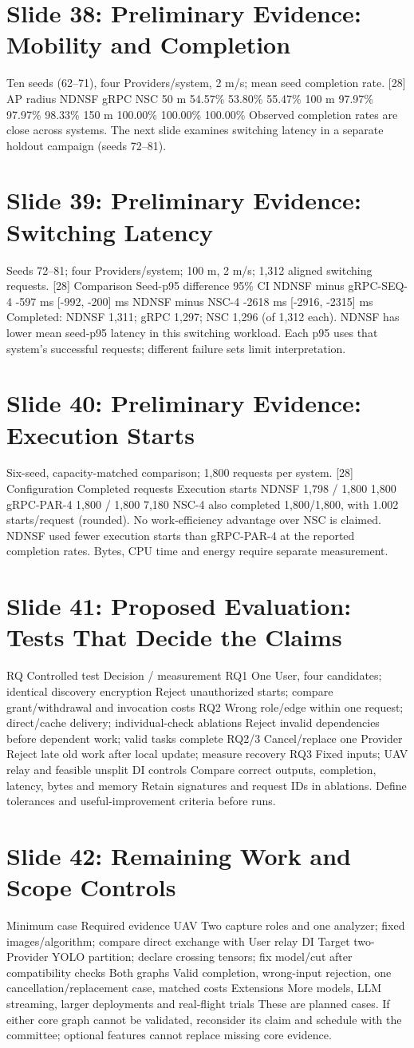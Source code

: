 \documentclass[11pt]{article}
\newcommand{\slideentry}[3]{\section*{Slide #1: #2}#3\par}
\begin{document}
\slideentry{38}{Preliminary Evidence: Mobility and Completion}{
Ten seeds (62--71), four Providers/system, 2 m/s; mean seed completion rate. [28] AP radius NDNSF gRPC NSC 50 m 54.57\% 53.80\% 55.47\% 100 m 97.97\% 97.97\% 98.33\% 150 m 100.00\% 100.00\% 100.00\% Observed completion rates are close across systems. The next slide examines switching latency in a separate holdout campaign (seeds 72--81).
}
\slideentry{39}{Preliminary Evidence: Switching Latency}{
Seeds 72--81; four Providers/system; 100 m, 2 m/s; 1,312 aligned switching requests. [28] Comparison Seed-p95 difference 95\% CI NDNSF minus gRPC-SEQ-4 -597 ms [-992, -200] ms NDNSF minus NSC-4 -2618 ms [-2916, -2315] ms Completed: NDNSF 1,311; gRPC 1,297; NSC 1,296 (of 1,312 each). NDNSF has lower mean seed-p95 latency in this switching workload. Each p95 uses that system’s successful requests; different failure sets limit interpretation.
}
\slideentry{40}{Preliminary Evidence: Execution Starts}{
Six-seed, capacity-matched comparison; 1,800 requests per system. [28] Configuration Completed requests Execution starts NDNSF 1,798 / 1,800 1,800 gRPC-PAR-4 1,800 / 1,800 7,180 NSC-4 also completed 1,800/1,800, with 1.002 starts/request (rounded). No work-efficiency advantage over NSC is claimed. NDNSF used fewer execution starts than gRPC-PAR-4 at the reported completion rates. Bytes, CPU time and energy require separate measurement.
}
\slideentry{41}{Proposed Evaluation: Tests That Decide the Claims}{
RQ Controlled test Decision / measurement RQ1 One User, four candidates; identical discovery encryption Reject unauthorized starts; compare grant/withdrawal and invocation costs RQ2 Wrong role/edge within one request; direct/cache delivery; individual-check ablations Reject invalid dependencies before dependent work; valid tasks complete RQ2/3 Cancel/replace one Provider Reject late old work after local update; measure recovery RQ3 Fixed inputs; UAV relay and feasible unsplit DI controls Compare correct outputs, completion, latency, bytes and memory Retain signatures and request IDs in ablations. Define tolerances and useful-improvement criteria before runs.
}
\slideentry{42}{Remaining Work and Scope Controls}{
Minimum case Required evidence UAV Two capture roles and one analyzer; fixed images/algorithm; compare direct exchange with User relay DI Target two-Provider YOLO partition; declare crossing tensors; fix model/cut after compatibility checks Both graphs Valid completion, wrong-input rejection, one cancellation/replacement case, matched costs Extensions More models, LLM streaming, larger deployments and real-flight trials These are planned cases. If either core graph cannot be validated, reconsider its claim and schedule with the committee; optional features cannot replace missing core evidence.
}
\end{document}
